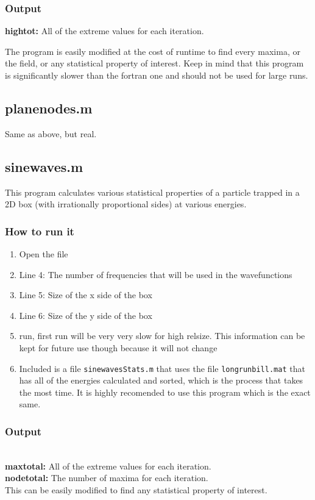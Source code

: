 \documentclass[12pt]{article}
\begin{document}
\subsubsection{Output}

\textbf{hightot:} All of the extreme values for each iteration.

The program is easily modified at the cost of runtime to find every maxima, or the field, or any statistical property of interest. Keep in mind that this program is significantly slower than the fortran one and should not be used for large runs.

\subsection{planenodes.m}

Same as above, but real.

\subsection{sinewaves.m}

This program calculates various statistical properties of a particle trapped in a 2D box (with irrationally proportional sides) at various energies.

\subsubsection{How to run it}

\begin{enumerate}
	\item{Open the file}
	\item{Line 4: The number of frequencies that will be used in the wavefunctions}
	\item{Line 5: Size of the x side of the box}
	\item{Line 6: Size of the y side of the box}
	\item{run, first run will be very very slow for high relsize. This information can be kept for future use though because it will not change}
	\item{Included is a file \verb|sinewavesStats.m| that uses the file \verb|longrunbill.mat| that has all of the energies calculated and sorted, which is the process that takes the most time. It is highly recomended to use this program which is the exact same.}
\end{enumerate}

\subsubsection{Output}
\\
\textbf{maxtotal:} All of the extreme values for each iteration.
\\
\textbf{nodetotal:} The number of maxima for each iteration.
\\
This can be easily modified to find any statistical property of interest.
\end{document}
